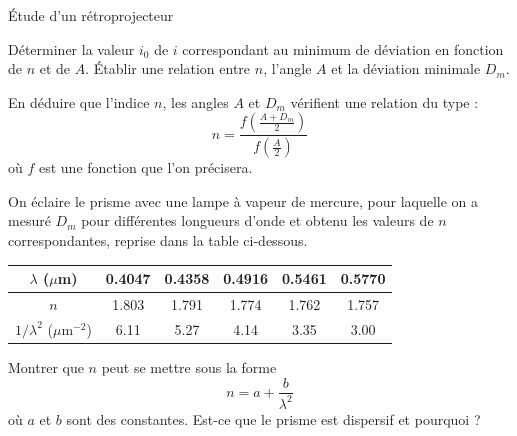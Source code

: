 \begin{exo}[PCSI]{\'Etude d'un rétroprojecteur}
\begin{quest}
\item Déterminer la valeur $i_0$ de $i$ correspondant au minimum de déviation en fonction de $n$ et de $A$. \'Etablir une relation entre $n$, l'angle $A$ et la déviation minimale $D_m$.


\item En déduire que l'indice $n$, les angles $A$ et $D_m$ vérifient une relation du type :
\begin{equation*}
n = \frac{f\left(\frac{A+D_m}{2}\right)}{f\left(\frac{A}{2}\right)}
\end{equation*}
où $f$ est une fonction que l'on précisera.


\item On éclaire le prisme avec une lampe à vapeur de mercure, pour laquelle on a mesuré $D_m$ pour différentes longueurs d'onde et obtenu les valeurs de $n$ correspondantes, reprise dans la table ci-dessous.

\begin{center}
\begin{tabular}{|c|c|c|c|c|c|}
\hline
$\lambda$ ($\mu$m) & 0.4047 & 0.4358 & 0.4916 & 0.5461 & 0.5770 \\
\hline
$n$ & 1.803 & 1.791 & 1.774 & 1.762 & 1.757 \\
\hline
$1/\lambda^2$ ($\mu$m$^{-2}$) & 6.11 & 5.27 & 4.14 & 3.35 & 3.00 \\
\hline
\end{tabular}
\end{center}

Montrer que $n$ peut se mettre sous la forme
\begin{equation*}
n = a + \frac{b}{\lambda^2}
\end{equation*}
où $a$ et $b$ sont des constantes. Est-ce que le prisme est dispersif et pourquoi ?


\end{quest}
\end{exo}
